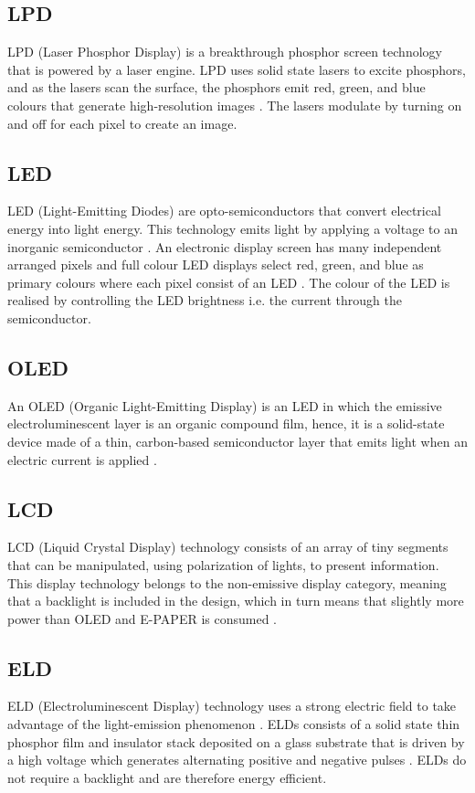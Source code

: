 \subsection{LPD}
LPD (Laser Phosphor Display) is a breakthrough phosphor screen technology that is powered by a laser engine. LPD uses solid state lasers to excite phosphors, and as the lasers scan the surface, the phosphors emit red, green, and blue colours that generate high-resolution images \cite{Hajjar2010}. The lasers modulate by turning on and off for each pixel to create an image.

\subsection{LED}
LED (Light-Emitting Diodes) are opto-semiconductors that convert electrical energy into light energy. This technology emits light by applying a voltage to an inorganic semiconductor \cite{Zissis2014}. An electronic display screen has many independent arranged pixels and full colour LED displays select red, green, and blue as primary colours where each pixel consist of an LED \cite{Ni2013}. The colour of the LED is realised by controlling the LED brightness i.e. the current through the semiconductor.

\subsection{OLED}
An OLED (Organic Light-Emitting Display) is an LED in which the emissive electroluminescent layer is an organic compound film, hence, it is a solid-state device made of a thin, carbon-based semiconductor layer that emits light when an electric current is applied \cite{Zissis2014}.

\subsection{LCD}
LCD (Liquid Crystal Display) technology consists of an array of tiny segments that can be manipulated, using polarization of lights, to present information. This display technology belongs to the non-emissive display category, meaning that a backlight is included in the design, which in turn means that slightly more power than OLED and E-PAPER is consumed \cite{Fer2015}.

\subsection{ELD}
ELD (Electroluminescent Display) technology uses a strong electric field to take advantage of the light-emission phenomenon \cite{Fer2015}. ELDs consists of a solid state thin phosphor film and insulator stack deposited on a glass substrate that is driven by a high voltage which generates alternating positive and negative pulses \cite{King}. ELDs do not require a backlight and are therefore energy efficient.

